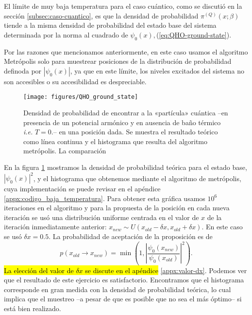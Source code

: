 \documentclass[%
 reprint,
 amsmath,amssymb,
 aps,
 pra,
]{revtex4-2}
\begin{document}
El límite de muy baja temperatura para el caso cuántico, como se discutió en la sección \ref{subsec:caso-cuantico}, es que la densidad de probabilidad $\pi^{(Q)}(x;\beta)$ tiende a la misma densidad de probabilidad del estado base del sistema determinada por la norma al cuadrado de $\psi_0(x), $(\ref{eq:QHO-ground-state}).

Por las razones que mencionamos anteriormente, en este caso usamos el algoritmo Metrópolis solo para muestrear posiciones de la distribución de probabilidad definoda por $|\psi_0(x)|$, ya que en este límite, los niveles excitados del sistema no son accesibles o su accesibilidad es despreciable. 

\begin{figure}[!t]
	\centering
	\texttt{[image: figures/QHO\_ground\_state]}
	\caption{Densidad de probabilidad de encontrar a la «partícula» cuántica –en presencia de un potencial armónico y en ausencia de baño térmico \textit{i.e.} $T=0$.– en una posición dada. Se muestra el resultado teórico como línea continua y el histograma que resulta del algoritmo metrópolis. La comparación}
	\label{fig:ground_state}
\end{figure}

En la figura \ref{fig:ground_state} mostramos la densidad de probabilidad teórica para el estado base, $|\psi_0(x)|^2$, y el histograma que obtenemos mediante el algoritmo de metrópolis, cuya implementación se puede revisar en el apéndice \ref{appx:codigo_baja_temperatura}. Para obtener esta gráfica usamos $10^6$ iteraciones en el algoritmo y para la propuesta de la posición en cada nueva iteración se usó una distribución uniforme centrada en el valor de $x$ de la iteración inmediatamente anterior: $x_{new} \sim U(x_{old} - \delta x, x_{old} + \delta x)$. En este caso se usó $\delta x = 0.5$. La probabilidad de aceptación de la proposición es de
\begin{equation}
	p(x_{old} \rightarrow x_{new}) = \min\left(1,\left|\frac{\psi_{0}(x_{new})}{\psi_{0}(x_{old})}\right|^2\right).
\end{equation}
\hl{La elección del valor de $\delta x$ se discute en el apéndice} \ref{appx:valor-dx}. Podemos ver que el resultado de este ejercicio es satisfactorio. Encontramos que el histograma corresponde en gran medida con la densidad de probabilidad teórica, lo cual implica que el muestreo –a pesar de que es posible que no sea el más óptimo– si está bien realizado.
\end{document}

